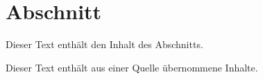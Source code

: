 \section{Abschnitt}
\label{sec:01_section}

Dieser Text enthält den Inhalt des Abschnitts.

\lipsum[1-5]

Dieser Text enthält aus einer Quelle übernommene Inhalte. \cite{000:Reference}

\lipsum[6-10]
